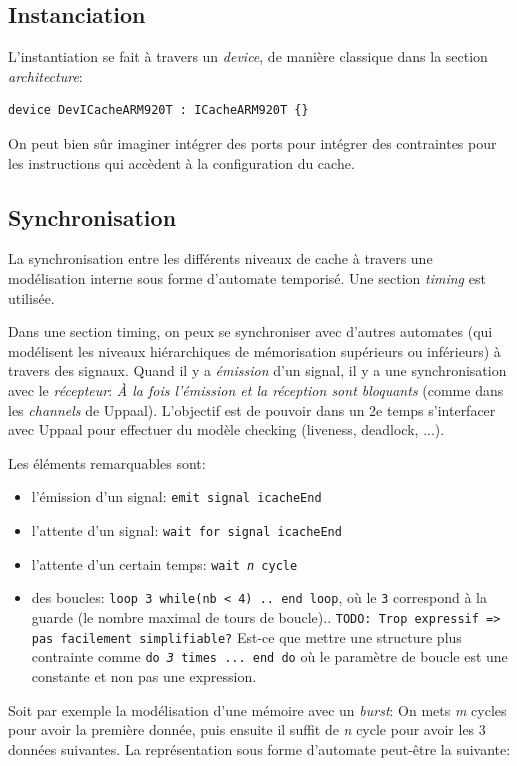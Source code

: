 \documentclass[11pt,a4paper]{article}
\begin{document}
\subsection{Instanciation}
L'instantiation se fait à travers un \emph{device}, de manière classique dans la section \emph{architecture}:
\begin{lstlisting}
device DevICacheARM920T : ICacheARM920T {}
\end{lstlisting}
On peut bien sûr imaginer intégrer des ports pour intégrer des contraintes pour les instructions qui accèdent à la configuration du cache.

\subsection{Synchronisation}
La synchronisation entre les différents niveaux de cache à travers une modélisation interne sous forme d'automate temporisé. Une section \emph{timing} est utilisée. 

Dans une section timing, on peux se synchroniser avec d'autres automates (qui modélisent les niveaux hiérarchiques de mémorisation supérieurs ou inférieurs) à travers des signaux. Quand il y a \emph{émission} d'un signal, il y a une synchronisation avec le \emph{récepteur}: \emph{À la fois l'émission et la réception sont bloquants} (comme dans les \emph{channels} de Uppaal). L'objectif est de pouvoir dans un 2e temps s'interfacer avec Uppaal pour effectuer du modèle checking (liveness, deadlock, ...).

Les éléments remarquables sont:
\begin{itemize}
\item l'émission d'un signal: \texttt{emit signal icacheEnd}
\item l'attente d'un signal: \texttt{wait for signal icacheEnd}
\item l'attente d'un certain temps: \texttt{wait \textit{n} cycle}
\item des boucles: \texttt{loop 3 while(nb < 4) .. end loop}, où le \texttt{3} correspond à la guarde (le nombre maximal de tours de boucle).. \texttt{TODO: Trop expressif => pas facilement simplifiable?} Est-ce que mettre une structure plus contrainte comme \texttt{do \textit{3} times ... end do} où le paramètre de boucle est une constante et non pas une expression.
\end{itemize}

Soit par exemple la modélisation d'une mémoire avec un \textsl{burst}: On mets \textit{m} cycles pour avoir la première donnée, puis ensuite il suffit de \textit{n} cycle pour avoir les 3 données suivantes. La représentation sous forme d'automate peut-être la suivante:
\end{document}
